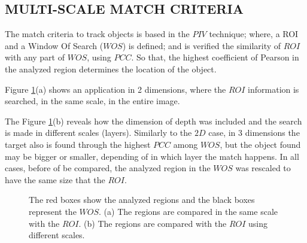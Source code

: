 
\subsection{MULTI-SCALE MATCH CRITERIA}
The match criteria to track objects is based in the $PIV$ technique; 
where, a ROI and a Window Of Search ($WOS$) is defined; and is 
verified the similarity of $ROI$ with any part of $WOS$, using $PCC$. 
So that, the highest coefficient of Pearson in the analyzed region 
determines the location of the object.

Figure \ref{fig:multires}(a) shows an application in 2 dimensions, where
the $ROI$ information is searched, in the same scale,  in the entire image.

The Figure \ref{fig:multires}(b) reveals how the dimension of depth was included and
the search is made in different scales (layers). Similarly to the $2D$ case, 
in 3 dimensions the target 
also is found through the highest $PCC$ among $WOS$, but the object found may be 
bigger or smaller, depending of in which layer the match happens. 
In all cases, before of be compared, the analyzed region in the $WOS$ was 
rescaled to have the same size that the $ROI$.

\begin{figure}[H]
\centering
  \caption{The red boxes show the analyzed regions and the black boxes represent the $WOS$. 
  (a) The regions are compared in the same scale with the $ROI$. 
  (b) The regions are compared with the $ROI$  using different scales.}
  \label{fig:multires}
\end{figure}




